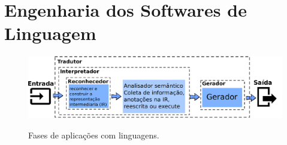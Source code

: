 





\section{Engenharia dos Softwares de Linguagem}\label{sec:softEng}

\begin{figure}[h]
	\center
	\includegraphics[scale=0.9]{Imagens/stagesLanguageApp}
	\label{fig:stagesLanguageApp}
	\caption{Fases de aplicaç\~{o}es com linguagens.}
\end{figure}

